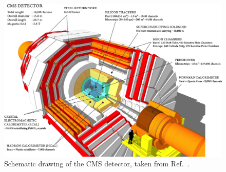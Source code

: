 \begin{figure}[h]
\centering
\includegraphics[width= 1\textwidth]{Figures/Chapter3/CMS_Detector.png}
\caption{Schematic drawing of the CMS detector, taken from Ref.~\cite{CMS_Detector_Run3}.}
\label{Figure:Chapter3_CMS_schematic}
\end{figure}


\section{}